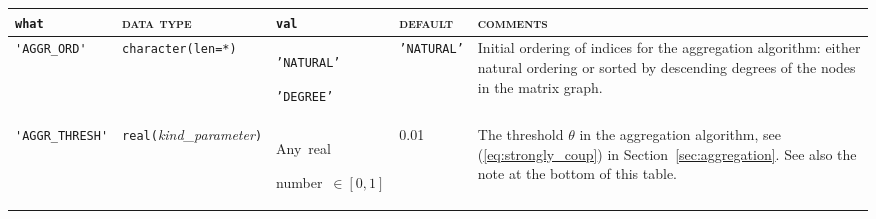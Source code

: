 \bsideways
\begin{center}
\begin{tabular}{|p{3.8cm}|l|p{2.5cm}|p{2.3cm}|p{6.6cm}|}
\hline
\verb|what|              & \textsc{data type}        &  \verb|val|      &  \textsc{default}  &
\textsc{comments} \\ \hline
\verb|'AGGR_ORD'|  & \verb|character(len=*)|
                         & \texttt{'NATURAL'} \par \texttt{'DEGREE'}
                         & \texttt{'NATURAL'}
                         & Initial ordering of indices for the aggregation
                            algorithm: either natural ordering or sorted by
                            descending degrees of the nodes in the
                            matrix graph. \\ \hline 
\verb|'AGGR_THRESH'| & \verb|real(|\emph{kind\_parameter}\verb|)|
                         & Any~real \par number~$\in [0, 1]$
                         & 0.01
                         & The threshold $\theta$ in the aggregation algorithm,
                            see (\ref{eq:strongly_coup}) in Section~\ref{sec:aggregation}.
                            See also the note at the bottom of this table. \\ \hline

\end{tabular}
\end{center}
